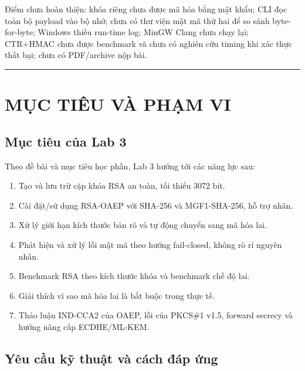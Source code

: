 \documentclass[12pt,a4paper,oneside]{report}
\begin{document}
Điểm chưa hoàn thiện: khóa riêng chưa được mã hóa bằng mật khẩu; CLI đọc toàn bộ payload vào bộ nhớ; chưa có thư viện mật mã thứ hai để so sánh byte-for-byte; Windows thiếu run-time log; MinGW Clang chưa chạy lại; CTR+HMAC chưa được benchmark và chưa có nghiên cứu timing khi xác thực thất bại; chưa có PDF/archive nộp bài.


\par\noindent\rule{\textwidth}{0.4pt}


\chapter{MỤC TIÊU VÀ PHẠM VI}


\section{Mục tiêu của Lab 3}


Theo đề bài và mục tiêu học phần, Lab 3 hướng tới các năng lực sau:


\begin{enumerate}[leftmargin=*]
\item Tạo và lưu trữ cặp khóa RSA an toàn, tối thiểu 3072 bit.
\item Cài đặt/sử dụng RSA-OAEP với SHA-256 và MGF1-SHA-256, hỗ trợ nhãn.
\item Xử lý giới hạn kích thước bản rõ và tự động chuyển sang mã hóa lai.
\item Phát hiện và xử lý lỗi mật mã theo hướng fail-closed, không rò rỉ nguyên nhân.
\item Benchmark RSA theo kích thước khóa và benchmark chế độ lai.
\item Giải thích vì sao mã hóa lai là bắt buộc trong thực tế.
\item Thảo luận IND-CCA2 của OAEP, lỗi của PKCS\#1 v1.5, forward secrecy và hướng nâng cấp ECDHE/ML-KEM.
\end{enumerate}


\section{Yêu cầu kỹ thuật và cách đáp ứng}
\end{document}
